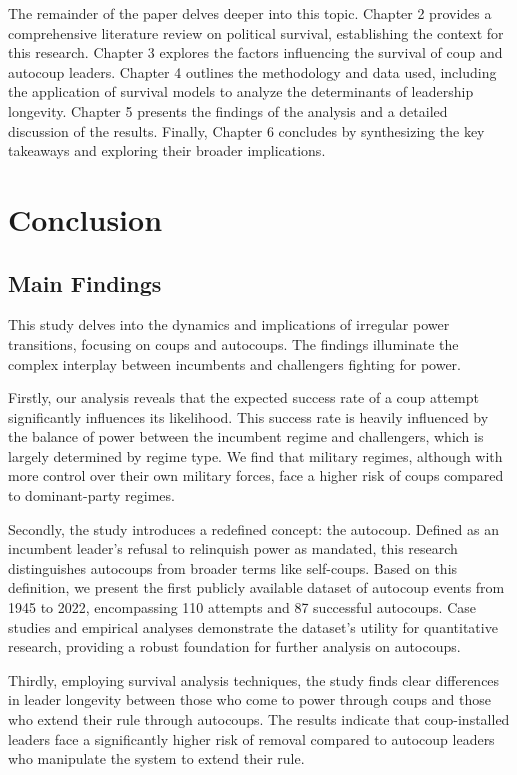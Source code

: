 \documentclass[
  12pt,
]{report}
\begin{document}
The remainder of the paper delves deeper into this topic. Chapter 2
provides a comprehensive literature review on political survival,
establishing the context for this research. Chapter 3 explores the
factors influencing the survival of coup and autocoup leaders. Chapter 4
outlines the methodology and data used, including the application of
survival models to analyze the determinants of leadership longevity.
Chapter 5 presents the findings of the analysis and a detailed
discussion of the results. Finally, Chapter 6 concludes by synthesizing
the key takeaways and exploring their broader implications.

\chapter{Conclusion}\label{conclusion-2}

\section{Main Findings}\label{main-findings}

This study delves into the dynamics and implications of irregular power
transitions, focusing on coups and autocoups. The findings illuminate
the complex interplay between incumbents and challengers fighting for
power.

Firstly, our analysis reveals that the expected success rate of a coup
attempt significantly influences its likelihood. This success rate is
heavily influenced by the balance of power between the incumbent regime
and challengers, which is largely determined by regime type. We find
that military regimes, although with more control over their own
military forces, face a higher risk of coups compared to dominant-party
regimes.

Secondly, the study introduces a redefined concept: the autocoup.
Defined as an incumbent leader's refusal to relinquish power as
mandated, this research distinguishes autocoups from broader terms like
self-coups. Based on this definition, we present the first publicly
available dataset of autocoup events from 1945 to 2022, encompassing 110
attempts and 87 successful autocoups. Case studies and empirical
analyses demonstrate the dataset's utility for quantitative research,
providing a robust foundation for further analysis on autocoups.

Thirdly, employing survival analysis techniques, the study finds clear
differences in leader longevity between those who come to power through
coups and those who extend their rule through autocoups. The results
indicate that coup-installed leaders face a significantly higher risk of
removal compared to autocoup leaders who manipulate the system to extend
their rule.
\end{document}
